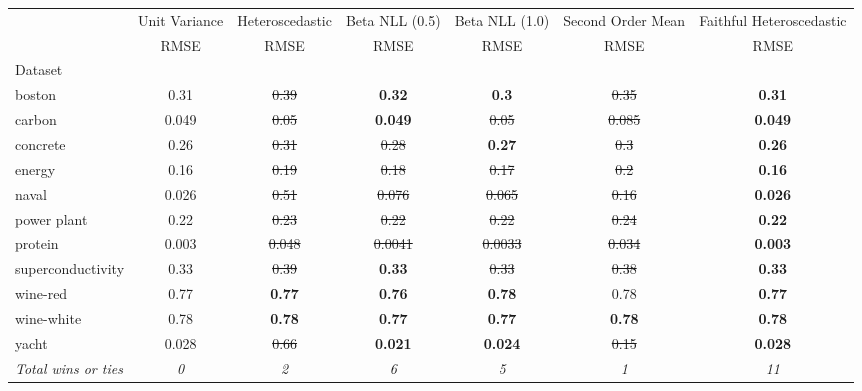 \begin{tabular}{l|c|c|c|c|c|c}
\toprule
{} & {Unit Variance} & {Heteroscedastic} & {Beta NLL (0.5)} & {Beta NLL (1.0)} & {Second Order Mean} & {Faithful Heteroscedastic} \\
{} & {RMSE} & {RMSE} & {RMSE} & {RMSE} & {RMSE} & {RMSE} \\
{Dataset} & {} & {} & {} & {} & {} & {} \\
\midrule
boston & 0.31 & \sout{0.39} & \textbf{0.32} & \textbf{0.3} & \sout{0.35} & \textbf{0.31} \\
carbon & 0.049 & \sout{0.05} & \textbf{0.049} & \sout{0.05} & \sout{0.085} & \textbf{0.049} \\
concrete & 0.26 & \sout{0.31} & \sout{0.28} & \textbf{0.27} & \sout{0.3} & \textbf{0.26} \\
energy & 0.16 & \sout{0.19} & \sout{0.18} & \sout{0.17} & \sout{0.2} & \textbf{0.16} \\
naval & 0.026 & \sout{0.51} & \sout{0.076} & \sout{0.065} & \sout{0.16} & \textbf{0.026} \\
power plant & 0.22 & \sout{0.23} & \sout{0.22} & \sout{0.22} & \sout{0.24} & \textbf{0.22} \\
protein & 0.003 & \sout{0.048} & \sout{0.0041} & \sout{0.0033} & \sout{0.034} & \textbf{0.003} \\
superconductivity & 0.33 & \sout{0.39} & \textbf{0.33} & \sout{0.33} & \sout{0.38} & \textbf{0.33} \\
wine-red & 0.77 & \textbf{0.77} & \textbf{0.76} & \textbf{0.78} & 0.78 & \textbf{0.77} \\
wine-white & 0.78 & \textbf{0.78} & \textbf{0.77} & \textbf{0.77} & \textbf{0.78} & \textbf{0.78} \\
yacht & 0.028 & \sout{0.66} & \textbf{0.021} & \textbf{0.024} & \sout{0.15} & \textbf{0.028} \\
\textit{{Total wins or ties}} & \textit{0} & \textit{2} & \textit{6} & \textit{5} & \textit{1} & \textit{11} \\
\bottomrule
\end{tabular}
